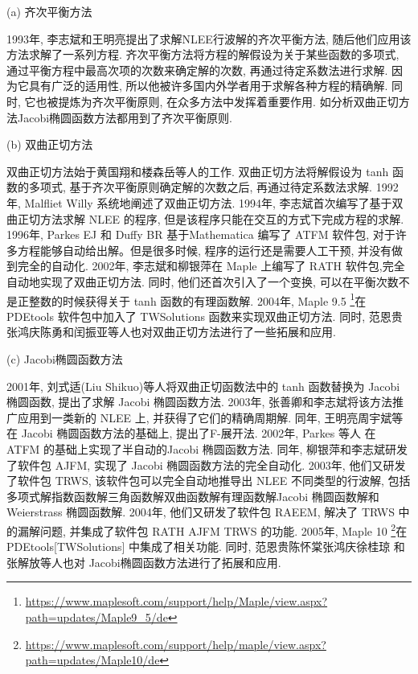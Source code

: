 (a) 齐次平衡方法

1993年, 李志斌和王明亮\cite{zhibin1993travelling}提出了求解NLEE行波解的齐次平衡方法, 随后他们应用该方法求解了一系列方程\cite{wang1995solitary,wang1996application}. 齐次平衡方法将方程的解假设为关于某些函数的多项式, 通过平衡方程中最高次项的次数来确定解的次数, 再通过待定系数法进行求解. 因为它具有广泛的适用性, 所以他被许多国内外学者用于求解各种方程的精确解\cite{hbm1998,hbm1998b,hbm1999,senthilvelan2001extended,zhao2002new,feng2004comment,rady2010homogeneous,eslami2014exact,nguyen2015modified}. 同时, 它也被提炼为齐次平衡原则, 在众多方法中发挥着重要作用. 如\Painleve{}分析\D 双曲正切方法\D Jacobi椭圆函数方法都用到了齐次平衡原则. 

(b) 双曲正切方法 

双曲正切方法始于黄国翔和楼森岳等人\cite{huang1989exact}的工作. 双曲正切方法将解假设为 tanh 函数的多项式, 基于齐次平衡原则确定解的次数之后, 再通过待定系数法求解. 1992年, Malfliet Willy \cite{malfliet1992solitary}系统地阐述了双曲正切方法. 1994年, 李志斌\cite{li_book_2007}首次编写了基于双曲正切方法求解 NLEE 的程序, 但是该程序只能在交互的方式下完成方程的求解. 1996年, Parkes EJ 和 Duffy BR \cite{parkes1996automated}基于Mathematica 编写了 ATFM 软件包, 对于许多方程能够自动给出解。但是很多时候, 程序的运行还是需要人工干预, 并没有做到完全的自动化. 2002年, 李志斌和柳银萍\cite{liu2001master,li2002rath}在 Maple 上编写了 RATH 软件包,完全自动地实现了双曲正切方法. 同时, 他们还首次引入了一个变换, 可以在平衡次数不是正整数的时候获得关于 tanh 函数的有理函数解. 2004年, Maple 9.5 \footnote{\url{https://www.maplesoft.com/support/help/Maple/view.aspx?path=updates/Maple9_5/de}}在 PDEtools 软件包中加入了 TWSolutions 函数来实现双曲正切方法. 同时, 范恩贵\cite{fan2000extended}\D 张鸿庆\D 陈勇\cite{zheng2003generalized}和闰振亚\cite{yan2001new}等人也对双曲正切方法进行了一些拓展和应用. 

(c) Jacobi椭圆函数方法

2001年, 刘式适(Liu Shikuo)等人\cite{liu2001jacobi}将双曲正切函数法中的 tanh 函数替换为 Jacobi 椭圆函数, 提出了求解 Jacobi 椭圆函数方法. 2003年, 张善卿和李志斌\cite{zhang2003jacobi}将该方法推广应用到一类新的 NLEE 上, 并获得了它们的精确周期解. 同年, 王明亮\D 周宇斌等\cite{zhou2003periodic}在 Jacobi 椭圆函数方法的基础上, 提出了F-展开法. 2002年, Parkes 等人\cite{parkes2002jacobi} 在 ATFM 的基础上实现了半自动的Jacobi 椭圆函数方法. 同年, 柳银萍和李志斌\cite{yin2002automated}研发了软件包 AJFM, 实现了 Jacobi 椭圆函数方法的完全自动化. 2003年, 他们\cite{yin2003automated}又研发了软件包 TRWS, 该软件包可以完全自动地推导出 NLEE 不同类型的行波解, 包括多项式解\D 指数函数解\D 三角函数解\D 双曲函数解\D 有理函数解\D Jacobi 椭圆函数解和 Weierstrass 椭圆函数解. 2004年, 他们\cite{li2004raeem}又研发了软件包 RAEEM, 解决了 TRWS 中的漏解问题, 并集成了软件包 RATH \D AJFM \D TRWS 的功能. 2005年, Maple 10 \footnote{\url{https://www.maplesoft.com/support/help/maple/view.aspx?path=updates/Maple10/de}}在 PDEtools[TWSolutions] 中集成了相关功能. 同时, 范恩贵\cite{fan2002applications}\D 陈怀棠\cite{chen2003improved}\D 张鸿庆\cite{wang2005new}\D 徐桂琼\cite{gui2005applications} 和张解放\cite{chao2005symbolic}等人也对 Jacobi椭圆函数方法进行了拓展和应用. 

